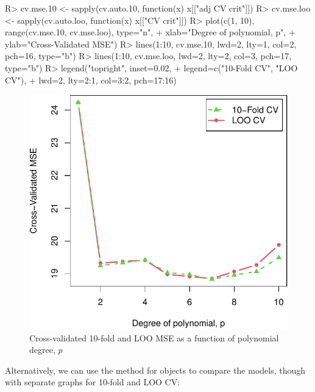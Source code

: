 \documentclass[
]{jss}
\begin{document}
\begin{CodeChunk}
\begin{CodeInput}
R> cv.mse.10 <- sapply(cv.auto.10, function(x) x[["adj CV crit"]])
R> cv.mse.loo <- sapply(cv.auto.loo, function(x) x[["CV crit"]])
R> plot(c(1, 10), range(cv.mse.10, cv.mse.loo), type="n",
+      xlab="Degree of polynomial, p",
+      ylab="Cross-Validated MSE")
R> lines(1:10, cv.mse.10, lwd=2, lty=1, col=2, pch=16, type="b")
R> lines(1:10, cv.mse.loo, lwd=2, lty=2, col=3, pch=17, type="b")
R> legend("topright", inset=0.02,
+        legend=c("10-Fold CV", "LOO CV"),
+        lwd=2, lty=2:1, col=3:2, pch=17:16)
\end{CodeInput}
\begin{figure}

{\centering \includegraphics[width=1\linewidth]{JSS-article_files/figure-latex/polynomial-regression-CV-graph-1} 

}

\caption[Cross-validated 10-fold and LOO MSE as a function of polynomial degree, $p$]{Cross-validated 10-fold and LOO MSE as a function of polynomial degree, $p$}\label{fig:polynomial-regression-CV-graph}
\end{figure}
\end{CodeChunk}

Alternatively, we can use the  method for
 objects to compare the models, though with separate
graphs for 10-fold and LOO CV:
\end{document}
